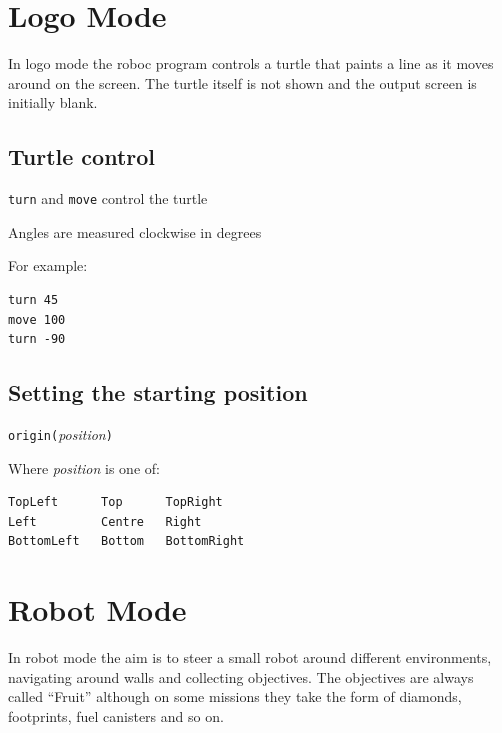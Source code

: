 \documentclass[12pt,a4paper,twoside]{article}
\renewcommand{\_}{\texttt{\symbol{95}}}
\begin{document}
\newpage
\section{Logo Mode} \label{sec:logo-mode}

In logo mode the roboc program controls a turtle that paints
a line as it moves around on the screen. The turtle itself is
not shown and the output screen is initially blank.

\subsection{Turtle control}

\begin{bulletlist}
\item \verb^turn^ and \verb^move^ control the turtle
\item Angles are measured clockwise in degrees
\end{bulletlist}

For example:
\begin{verbatim}
turn 45
move 100
turn -90
\end{verbatim}

\subsection{Setting the starting position}

\verb^origin(^\emph{position}\verb^)^

Where \emph{position} is one of:
\begin{verbatim}
TopLeft      Top      TopRight
Left         Centre   Right
BottomLeft   Bottom   BottomRight
\end{verbatim}

\newpage
\section{Robot Mode} \label{sec:robot-mode}

In robot mode the aim is to steer a small robot around different
environments, navigating around walls and collecting objectives. The
objectives are always called ``Fruit'' although on some missions they
take the form of diamonds, footprints, fuel canisters and so on.
\end{document}
